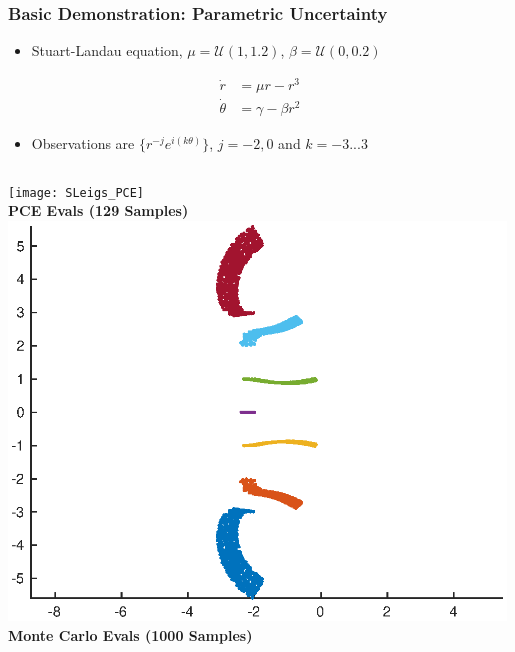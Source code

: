 \documentclass[9pt]{beamer}
\begin{document}
\begin{frame}
\frametitle{Basic Demonstration: Parametric Uncertainty}
\label{sec-3-2}

\begin{itemize}
\item Stuart-Landau equation, $\mu = \mathcal{U}(1,1.2)$, $\beta = \mathcal{U}(0,0.2)$
\end{itemize}
\begin{equation*}
\begin{aligned}
\dot{r} &= \mu r - r^3 \\
\dot{\theta} &= \gamma - \beta r^2
\end{aligned}
\end{equation*}
\begin{itemize}
\item Observations are $\lbrace r^{-j} e^{i(k\theta)} \rbrace$, $j = -2,0$ and $k = -3...3$
\end{itemize}

\begin{columns}[c]
    \centering
    \texttt{[image: SLeigs\_PCE]} \\
    {\bf PCE Evals (129 Samples)}
    \centering
    \includegraphics[width=0.99\textwidth]{SLeigs_MC} \\
    {\bf Monte Carlo Evals (1000 Samples)}
\end{columns}
\end{frame}
\end{document}
